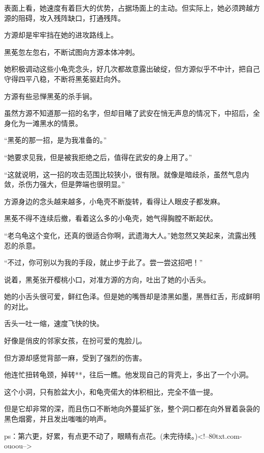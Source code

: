 \begin{this_body}
表面上看，她速度有着巨大的优势，占据场面上的主动。但实际上，她必须跨越方源的阻碍，攻入残阵缺口，打通残阵。

方源却是牢牢挡在她的进攻路线上。

黑莬忽左忽右，不断试图向方源本体冲刺。

她积极调动这些小龟壳念头，好几次都故意露出破绽，但方源似乎不中计，把自己守得四平八稳，不断将黑莬驱赶向外。

方源有些忌惮黑莬的杀手锏。

虽然方源不知道那一招的名字，但却目睹了武安在悄无声息的情况下，中招后，全身化为一滩黑水的情景。

“黑莬的那一招，是为我准备的。”

“她要求见我，但是被我拒绝之后，值得在武安的身上用了。”

“这就说明，这一招的攻击范围比较狭小，很有限。就像是暗歧杀，虽然气息内敛，杀伤力强大，但是弊端也很明显。”

方源身边的念头越来越多，小龟壳不断旋转，看得让人眼皮子都发麻。

黑莬不得不连续后撤，看着这么多的小龟壳，她气得胸膛不断起伏。

“老乌龟这个变化，还真的很适合你啊，武遗海大人。”她忽然又笑起来，流露出残忍的杀意。

“不过，你可别以为我的手段，就止步于此了。尝一尝这招吧！”

说着，黑莬张开樱桃小口，对准方源的方向，吐出了她的小舌头。

她的小舌头很可爱，鲜红色泽。但是她的嘴唇却是漆黑如墨，黑唇红舌，形成鲜明的对比。

舌头一吐一缩，速度飞快的快。

好像是俏皮的邻家女孩，在扮可爱的鬼脸儿。

但方源却感觉背部一麻，受到了强烈的伤害。

他连忙扭转龟颈，掉转**，往后一瞧。他发现自己的背壳上，多出了一个小洞。

这个小洞，只有脸盆大小，和龟壳偌大的体积相比，完全不值一提。

但是它却非常的深，而且伤口不断地向外蔓延扩张，整个洞口都在向外冒着袅袅的黑色烟雾，并且发出嗤嗤的响声。

ps：第六更，好累，有点更不动了，眼睛有点花。(未完待续。)<!--80txt.com-ouoou-->

\end{this_body}

